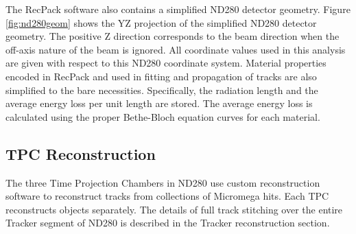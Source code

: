 The RecPack software also contains a simplified ND280 detector geometry. Figure \ref{fig:nd280geom} shows the YZ projection of the simplified ND280 detector geometry. The positive Z direction corresponds to the beam direction when the off-axis nature of the beam is ignored. All coordinate values used in this analysis are given with respect to this ND280 coordinate system. Material properties encoded in RecPack and used in fitting and propagation of tracks are also simplified to the bare necessities. Specifically, the radiation length and the average energy loss per unit length are stored. The average energy loss is calculated using the proper Bethe-Bloch equation curves for each material. 

\subsection{TPC Reconstruction}
\label{sec:tpcrecon}

The three Time Projection Chambers in ND280 use custom reconstruction software to reconstruct tracks from collections of Micromega hits. Each TPC reconstructs objects separately. The details of full track stitching over the entire Tracker segment of ND280 is described in the Tracker reconstruction section.

